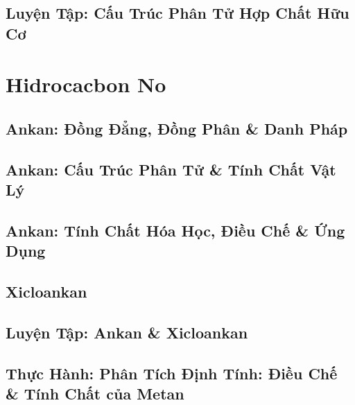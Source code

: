 \documentclass[oneside]{book}
\numberwithin{equation}{section}
\begin{document}

\section{Luyện Tập: Cấu Trúc Phân Tử Hợp Chất Hữu Cơ}


\chapter{Hidrocacbon No}

\section{Ankan: Đồng Đẳng, Đồng Phân \& Danh Pháp}


\section{Ankan: Cấu Trúc Phân Tử \& Tính Chất Vật Lý}


\section{Ankan: Tính Chất Hóa Học, Điều Chế \& Ứng Dụng}


\section{Xicloankan}


\section{Luyện Tập: Ankan \& Xicloankan}


\section{Thực Hành: Phân Tích Định Tính: Điều Chế \& Tính Chất của Metan}
\end{document}
